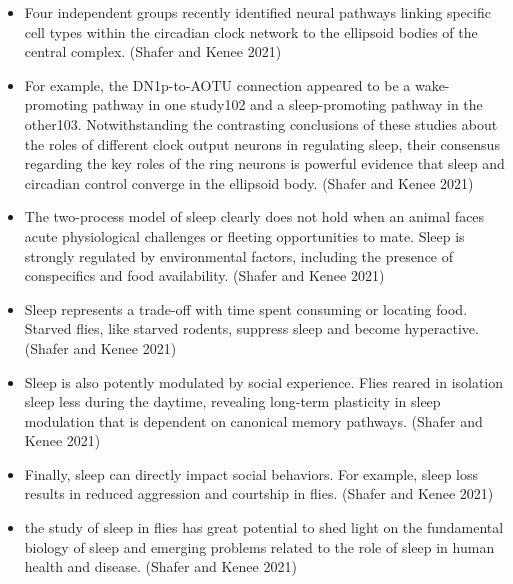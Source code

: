 \documentclass[11pt]{article}
\begin{document}
\begin{itemize}
    \item Four independent groups recently identified neural pathways linking specific cell types within the circadian clock network to the ellipsoid bodies of the central complex.
    \cite{shaferRegulationDrosophilaSleep2021} (Shafer and Kenee 2021)

    \item For example, the DN1p-to-AOTU connection appeared to be a wake-promoting pathway in one study102 and a sleep-promoting pathway in the
    other103.
    Notwithstanding the contrasting conclusions of these studies about the roles of different clock output neurons in regulating sleep, their 
    consensus regarding the key roles of the ring neurons is powerful evidence that sleep and circadian control converge in the ellipsoid body.
    \cite{shaferRegulationDrosophilaSleep2021} (Shafer and Kenee 2021)

    \item The two-process model of sleep clearly does not hold when an animal faces acute physiological challenges or fleeting opportunities to mate. Sleep is strongly regulated by environmental factors, including the presence of conspecifics and food availability.
    \cite{shaferRegulationDrosophilaSleep2021} (Shafer and Kenee 2021)

    \item Sleep represents a trade-off with time spent consuming or locating food. Starved flies, like starved rodents, suppress sleep and become hyperactive.
    \cite{shaferRegulationDrosophilaSleep2021} (Shafer and Kenee 2021)

    \item Sleep is also potently modulated by social experience. Flies reared in isolation sleep less during the daytime, revealing long-term plasticity in sleep modulation that is dependent on canonical memory pathways.
    \cite{shaferRegulationDrosophilaSleep2021} (Shafer and Kenee 2021)

    \item Finally, sleep can directly impact social behaviors. For example, sleep loss results in reduced aggression and courtship in flies.
    \cite{shaferRegulationDrosophilaSleep2021} (Shafer and Kenee 2021)

    \item the study of sleep in flies has great potential to shed light on the fundamental biology of sleep and emerging problems related to the role of sleep in human health and disease.
    \cite{shaferRegulationDrosophilaSleep2021} (Shafer and Kenee 2021)


\end{itemize}
\end{document}
